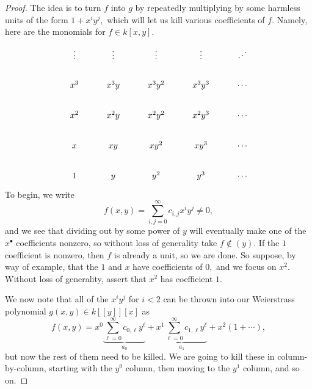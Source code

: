 \documentclass[../notes.tex]{subfiles}
\begin{document}
\begin{proof}
	The idea is to turn $f$ into $g$ by repeatedly multiplying by some harmless units of the form $1+x^iy^j,$ which will let us kill various coefficients of $f.$ Namely, here are the monomials for $f\in k[x,y].$
	\[\begin{tikzcd}
		\vdots & \vdots & \vdots & \vdots & \iddots \\
		{x^3} & {x^3y} & {x^3y^2} & {x^3y^3} & \cdots \\
		{x^2} & {x^2y} & {x^2y^2} & {x^2y^3} & \cdots \\
		x & xy & {xy^2} & {xy^3} & \cdots \\
		1 & y & {y^2} & {y^3} & \cdots
	\end{tikzcd}\]
	To begin, we write
	\[f(x,y)=\sum_{i,j=0}^\infty c_{i,j}x^iy^j\ne0,\]
	and we see that dividing out by some power of $y$ will eventually make one of the $x^\bullet$ coefficients nonzero, so without loss of generality take $f\notin(y).$ If the $1$ coefficient is nonzero, then $f$ is already a unit, so we are done. So suppose, by way of example, that the $1$ and $x$ have coefficients of $0,$ and we focus on $x^2.$ Without loss of generality, assert that $x^2$ has coefficient $1.$
	
	We now note that all of the $x^iy^j$ for $i<2$ can be thrown into our Weierstrass polynomial $g(x,y)\in k[[y]][x]$ as
	\[f(x,y)=x^0\underbrace{\sum_{\ell=0}^\infty c_{0,\ell}y^\ell}_{a_0}+\underbrace{x^1\sum_{\ell=0}^\infty c_{1,\ell}y^\ell}_{a_1}+x^2\left(1+\cdots\right),\]
	but now the rest of them need to be killed. We are going to kill these in column-by-column, starting with the $y^0$ column, then moving to the $y^1$ column, and so on.


\end{proof}
\end{document}
